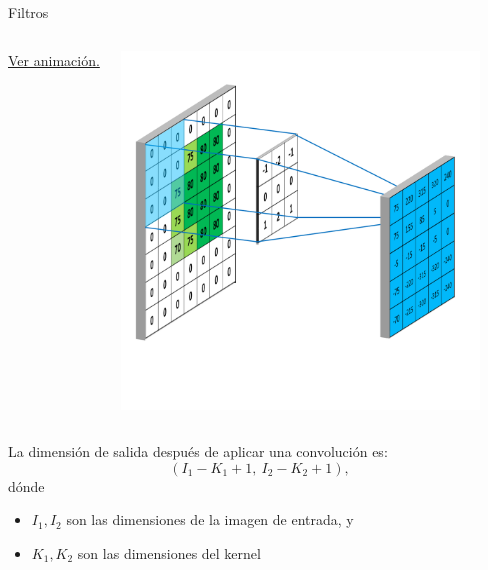 \begin{frame}{Filtros}

    \vspace*{-2.5cm}
    \begin{columns}
    \column{3cm}
        
        \href{https://mlnotebook.github.io/img/CNN/convSobel.gif}{Ver animación.}
        
    \column{8cm}
    \begin{center}
        \includegraphics[height=9.5cm]{Figuras/Fig10}
    \end{center}
    \end{columns}
    
\end{frame}

\begin{frame}

    La dimensión de salida después de aplicar una convolución es:
    \[
        (I_1 - K_1 + 1,\ I_2 - K_2 + 1),
    \]
    dónde
    \begin{itemize}
        \item 
        \( I_1, I_2 \) son las dimensiones de la imagen de entrada, y 
        \item 
        \( K_1, K_2 \) son las dimensiones del kernel
    \end{itemize}
\end{frame}
